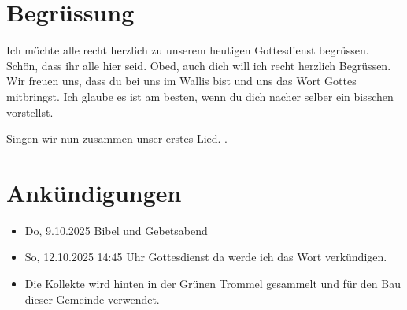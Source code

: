 \documentclass{../../inc/mybib}
\begin{document}
\section{Begrüssung}
Ich möchte alle recht herzlich zu unserem heutigen Gottesdienst begrüssen. Schön, dass ihr alle hier seid. Obed, auch dich will ich recht herzlich Begrüssen. Wir freuen uns, dass du bei uns im Wallis bist und uns das Wort Gottes mitbringst. Ich glaube es ist am besten, wenn du dich nacher selber ein bisschen vorstellst.

\beten{}

Singen wir nun zusammen unser erstes Lied.
{}.

\section{Ankündigungen}
\begin{itemize}
    \item {} Do,  9.10.2025 Bibel und Gebetsabend
    \item {} So, 12.10.2025 14:45 Uhr Gottesdienst da werde ich das Wort verkündigen.    
    \item Die Kollekte wird hinten in der Grünen Trommel gesammelt und für den Bau dieser Gemeinde verwendet.
\end{itemize}
\end{document}
